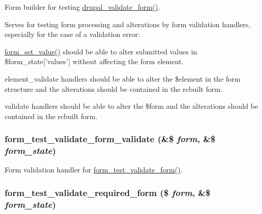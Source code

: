 \label{form__test_8module_a0407b03ec9fd246fee1c31844bb5ffbc}
Form builder for testing \hyperlink{group__form__api_ga05a4aea7c6aa28db24a5f96da6948f34}{drupal\_\-validate\_\-form()}.

Serves for testing form processing and alterations by form validation handlers, especially for the case of a validation error:
\begin{DoxyItemize}
\item \hyperlink{group__form__api_ga2a377a1fcccea79d06d1a735dea433f3}{form\_\-set\_\-value()} should be able to alter submitted values in \$form\_\-state\mbox{[}'values'\mbox{]} without affecting the form element.
\item element\_\-validate handlers should be able to alter the \$element in the form structure and the alterations should be contained in the rebuilt form.
\item validate handlers should be able to alter the \$form and the alterations should be contained in the rebuilt form. 
\end{DoxyItemize}\hypertarget{form__test_8module_a187c76e4b9893f38a549a9a8b8564655}{
\subsubsection[{form\_\-test\_\-validate\_\-form\_\-validate}]{\setlength{\rightskip}{0pt plus 5cm}form\_\-test\_\-validate\_\-form\_\-validate (\&\$ {\em form}, \/  \&\$ {\em form\_\-state})}}
\label{form__test_8module_a187c76e4b9893f38a549a9a8b8564655}
Form validation handler for \hyperlink{form__test_8module_a0407b03ec9fd246fee1c31844bb5ffbc}{form\_\-test\_\-validate\_\-form()}. \hypertarget{form__test_8module_a19d7e573a59984582ba545d6a796fe2b}{
\subsubsection[{form\_\-test\_\-validate\_\-required\_\-form}]{\setlength{\rightskip}{0pt plus 5cm}form\_\-test\_\-validate\_\-required\_\-form (\$ {\em form}, \/  \&\$ {\em form\_\-state})}}
